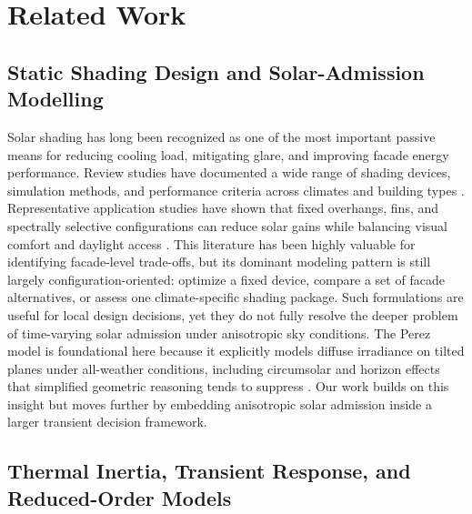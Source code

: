\documentclass[5p,times,twocolumn]{elsarticle}
\begin{document}
\section{Related Work}
\label{sec:related}

\subsection{Static Shading Design and Solar-Admission Modelling}

Solar shading has long been recognized as one of the most important passive means for reducing cooling load, mitigating glare, and improving facade energy performance. Review studies have documented a wide range of shading devices, simulation methods, and performance criteria across climates and building types \cite{kirimtat2016}. Representative application studies have shown that fixed overhangs, fins, and spectrally selective configurations can reduce solar gains while balancing visual comfort and daylight access \cite{valladares2014,nazari2023}. This literature has been highly valuable for identifying facade-level trade-offs, but its dominant modeling pattern is still largely configuration-oriented: optimize a fixed device, compare a set of facade alternatives, or assess one climate-specific shading package. Such formulations are useful for local design decisions, yet they do not fully resolve the deeper problem of time-varying solar admission under anisotropic sky conditions. The Perez model is foundational here because it explicitly models diffuse irradiance on tilted planes under all-weather conditions, including circumsolar and horizon effects that simplified geometric reasoning tends to suppress \cite{perez1990}. Our work builds on this insight but moves further by embedding anisotropic solar admission inside a larger transient decision framework.

\subsection{Thermal Inertia, Transient Response, and Reduced-Order Models}
\end{document}
